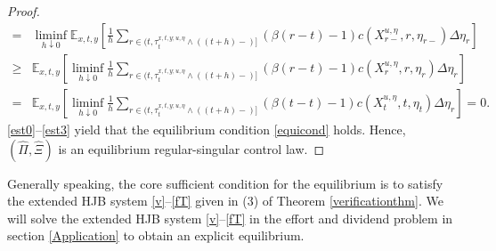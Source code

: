 \documentclass[11pt,reqno]{article}%
\numberwithin{equation}{section}
\begin{document}
\begin{proof}
\begin{equation}
\begin{aligned}
=&\liminf\limits_{h\downarrow 0}\mathbb{E}_{x,t,y}\left[\frac{1}{h}\sum\limits_{r\in(t,\tau^{x,t,y;u,\eta}_{t}\wedge((t+h)-)]}\left(\beta(r-t)-1\right) c\left(X^{u,\eta}_{r-}, r, \eta_{r-}\right)\Delta\eta_{r}\right]\\
\geq&\mathbb{E}_{x,t,y}\left[\liminf\limits_{h\downarrow 0}\frac{1}{h}\sum\limits_{r\in(t,\tau^{x,t,y;u,\eta}_{t}\wedge((t+h)-)]}\left(\beta(r-t)-1\right) c\left(X^{u,\eta}_{r}, r, \eta_{r}\right)\Delta\eta_{r} \right]\\
=&\mathbb{E}_{x,t,y}\left[\liminf\limits_{h\downarrow 0}\frac{1}{h}\sum\limits_{r\in(t,\tau^{x,t,y;u,\eta}_{t}\wedge((t+h)-)]}\left(\beta(t-t)-1\right)c(X^{u,\eta}_t, t, \eta_t)\Delta\eta_{r}\right]= 0.
\end{aligned}\label{est3}\end{equation}
\eqref{est0}--\eqref{est3} yield that the equilibrium condition \eqref{equicond} holds. Hence, $(\hat{\Pi},\hat{\Xi})$ is an equilibrium  regular-singular control law.
\end{proof}

Generally speaking, the core sufficient condition for the equilibrium is to satisfy the extended HJB system \eqref{v}--\eqref{fT} given in (3) of Theorem \ref{verificationthm}. We will solve the extended HJB system \eqref{v}--\eqref{fT} in the effort and dividend problem in section \ref{Application} to obtain an explicit equilibrium.
\end{document}
